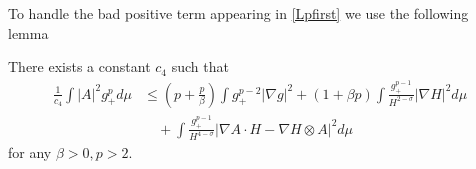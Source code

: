 To handle the bad positive term appearing in \cref{Lpfirst} we use the following lemma
\begin{lemma}
    There exists a constant $ c_{4} $ such that  \begin{align*}
        \frac{1}{c_{4}} \int |A|^{2}g_{+}^{p} d \mu & \le \left( p+ \frac{p}{\beta} \right) \int g_{+}^{p-2}| \nabla g|^{2} + (1+ \beta p)\int \frac{g_{+}^{p-1}}{H^{2-\sigma}}| \nabla H|^{2} d \mu \\
        & \quad + \int \frac{g_{+}^{p-1}}{H^{4-\sigma}}|\nabla A \cdot H - \nabla H \otimes A|^{2} d \mu
    \end{align*}
    for any $ \beta >0 , p>2$.
\end{lemma}
\begin{comment}
    \begin{align*}
    \Delta g & = \Delta  \left(\frac{|A|^{2}}{H^{2}} \right)H^{\sigma} + \left( \frac{|A|^{2}}{H^{2}} - (1+\eta) \right)\Delta H^{\sigma} + 2\left<  \nabla \left( \frac{|A|^{2}}{H^{2}}\right) , \nabla H^{\sigma} \right> \\
    & = \left( \frac{\Delta |A|^{2}}{H^{2}} -|A|^{2} \frac{\Delta H^{2}}{H^{4}} - \frac{2}{H^{4}}\left< \nabla |A|^{2}, \nabla H^{2}  \right>+ \frac{2|A|^{2}}{H^{6}}|\nabla H^{2}|^{2}\right)H^{\sigma} \\
    & \quad + \left( \frac{|A|^{2}}{H^{2}} - (1+\eta) \right)\left( \sigma H^{\sigma -1}\Delta H + \sigma (\sigma -1)H^{\sigma -2}| \nabla H|^{2} \right) \\
    & = \frac{\Delta |A|^{2}}{H^{2-\sigma}} - |A|^{2}\left( \frac{2H \Delta H + |\nabla H|^{2}}{H^{4-\sigma}} \right) - \frac{2}{H^{4-\sigma}}\left( 4H\left< \nabla A, \nabla H \otimes A \right> \right) + 8|A|^{2}\frac{|\nabla H|^{2}}{H^{4-\sigma}} \\
    & \quad 
\end{align*}
\end{comment}
